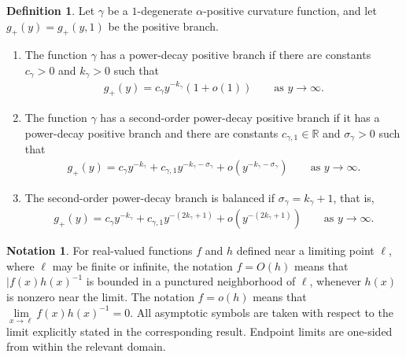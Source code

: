 \documentclass{amsart}
\theoremstyle{plain}
\theoremstyle{mainintrothm}
\theoremstyle{definition}
\newtheorem{definition}[theorem]{Definition}
\newtheorem{notation}[theorem]{Notation}
\begin{document}
\begin{definition}
	\label{def:degenerate-positive-branch-asymptotics}
	Let $\gamma$ be a $1$-degenerate $\alpha$-positive curvature function, and
	let $g_+(y)=g_+(y,1)$ be the positive branch.

	\begin{enumerate}[label=\textup{(\roman*)}]
		\item The function $\gamma$ has a power-decay positive branch if there
		are constants $c_\gamma>0$ and $k_\gamma>0$ such that
		\begin{align*}
			g_+(y)
			=
			c_\gamma y^{-k_\gamma}(1+o(1))
			\qquad\text{as }y\to\infty .
		\end{align*}

		\item The function $\gamma$ has a second-order power-decay positive
		branch if it has a power-decay positive branch and there are constants
		$c_{\gamma,1}\in\mathbb R$ and $\sigma_\gamma>0$ such that
		\begin{align*}
			g_+(y)
			=
			c_\gamma y^{-k_\gamma}
			+
			c_{\gamma,1}y^{-k_\gamma-\sigma_\gamma}
			+
			o(y^{-k_\gamma-\sigma_\gamma})
			\qquad\text{as }y\to\infty .
		\end{align*}

		\item The second-order power-decay branch is balanced if
		$\sigma_\gamma=k_\gamma+1$, that is,
		\begin{align*}
			g_+(y)
			=
			c_\gamma y^{-k_\gamma}
			+
			c_{\gamma,1}y^{-(2k_\gamma+1)}
			+
			o(y^{-(2k_\gamma+1)})
			\qquad\text{as }y\to\infty .
		\end{align*}
	\end{enumerate}


\end{definition}

\begin{notation}
	\label{not:asymptotic-notation}
	For real-valued functions $f$ and $h$ defined near a limiting point
	$\ell$, where $\ell$ may be finite or infinite, the notation $f=O(h)$ means
	that $|f(x)h(x)^{-1}$ is bounded in a punctured neighborhood of $\ell$,
	whenever $h(x)$ is nonzero near the limit. The notation $f=o(h)$ means that
	$\lim\limits_{x\to\ell}f(x)h(x)^{-1}=0$. All asymptotic symbols are
	taken with respect to the limit explicitly stated in the corresponding
	result. Endpoint limits are one-sided from within the relevant domain.
\end{notation}
\end{document}
